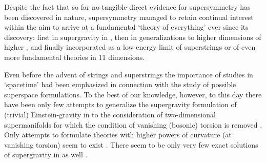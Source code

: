 \documentclass[a4paper,10pt]{article}
\providecommand{\N}{N}
\renewcommand{\^}{{}^}
\renewcommand{\_}{\!{}_}
\begin{document}

Despite the fact that so far no tangible direct evidence for
supersymmetry has been discovered in nature, supersymmetry
\cite{Wess:1977fn} managed to retain continual interest within the aim to
arrive at a fundamental `theory of everything' ever since its
discovery: first in supergravity \cite{Freedman:1976xh} in \coordHE{}, then in
generalizations to higher dimensions of higher \myHighlight{$\N$}\coordHE{}
\cite{Vafa:1996xn}, and finally incorporated as a low energy limit of
superstrings \cite{Witten:1995ex} or of even more fundamental theories
\cite{Sezgin:1997cj} in 11 dimensions.

Even before the advent of strings and superstrings the importance of
studies in \coordHE{} `spacetime' had been emphasized \cite{Howe:1979ia}
in connection with the study of possible superspace formulations. 
To the best of our knowledge, however, to this
day there have been only few attempts  to generalize the supergravity
formulation of (trivial) Einstein-gravity in \coordHE{} to the
consideration of two-dimensional \coordHE{} supermanifolds for which the
condition of vanishing (bosonic) torsion is removed 
\cite{Ertl:Diss,EKK}. Only attempts to
formulate theories with higher powers of curvature (at vanishing
torsion) seem to exist \cite{Hindawi:1996fy}. There seem to be only
very few exact solutions of supergravity in \coordHE{} as well
\cite{Aichelburg:1978fn}.
\end{document}
